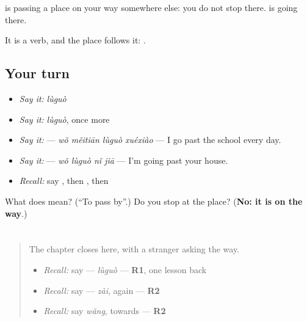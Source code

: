 \begin{grammarlens}[title={What you've built}]
 is passing a place on your way somewhere else: you do not stop there.  is going there.

It is a verb, and the place follows it: .
\end{grammarlens}

\subsection*{Your turn}
\begin{itemize}
\raggedright
  \item \emph{Say it:} \emph{lùguò}
  \item \emph{Say it:} \emph{lùguò}, once more
  \item \emph{Say it:}  — \emph{wǒ měitiān lùguò xuéxiào} — I go past the school every day.
  \item \emph{Say it:}  — \emph{wǒ lùguò nǐ jiā} — I'm going past your house.
  \item \emph{Recall:} say , then , then 
\end{itemize}

\begin{tcolorbox}[breakable,colback=teal!4,colframe=teal!35!black,title={Before you move on}]
What does  mean? (\textquotedblleft{}To pass by\textquotedblright{}.) Do you stop at the place? (\textbf{No: it is on the way}.)
\end{tcolorbox}
\section[Practice]{}

\label{lesson:ZH-C283-practice}



\begin{quote}
The chapter closes here, with a stranger asking the way.

\begin{itemize}
\raggedright
  \item \emph{Recall:} say  — \emph{lùguò} — \textbf{R1}, one lesson back
  \item \emph{Recall:} say  — \emph{zài}, again — \textbf{R2}
  \item \emph{Recall:} say \emph{wǎng}, towards — \textbf{R2}
\end{itemize}
\end{quote}

